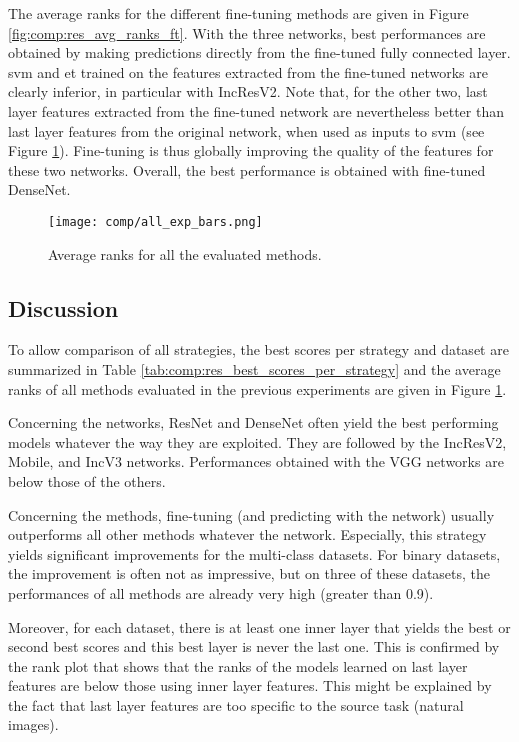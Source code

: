 The average ranks for the different fine-tuning methods are given in Figure \ref{fig:comp:res_avg_ranks_ft}. With the three networks, best performances are obtained by making predictions directly from the fine-tuned fully connected layer. \acrshort{svm} and \acrshort{et} trained on the features extracted from the fine-tuned networks are clearly inferior, in particular with IncResV2. Note that, for the other two, last layer features extracted from the fine-tuned network are nevertheless better than last layer features from the original network, when used as inputs to \acrshort{svm} (see Figure \ref{fig:comp:res_avg_ranks_all_methods}). Fine-tuning is thus globally improving the quality of the features for these two networks. Overall, the best performance is obtained with fine-tuned DenseNet.


\begin{figure}
    \centering 
    \texttt{[image: comp/all\_exp\_bars.png]}
    \caption{Average ranks for all the evaluated methods.}
    \label{fig:comp:res_avg_ranks_all_methods}
\end{figure}

\subsection{Discussion}
\label{ssec:comp:exp_comparing}

To allow comparison of all strategies, the best scores per strategy and dataset are summarized in Table \ref{tab:comp:res_best_scores_per_strategy} and the average ranks of all methods evaluated in the previous experiments are given in Figure \ref{fig:comp:res_avg_ranks_all_methods}.

Concerning the networks, ResNet and DenseNet often yield the best performing models whatever the way they are exploited. They are followed by the IncResV2, Mobile, and IncV3 networks. Performances obtained with the VGG networks are below those of the others.

Concerning the methods, fine-tuning (and predicting with the network) usually outperforms all other methods whatever the network. Especially, this strategy yields significant improvements for the multi-class datasets. For binary datasets, the improvement is often not as impressive, but on three of these datasets, the performances of all methods are already very high (greater than 0.9).

Moreover, for each dataset, there is at least one inner layer that yields the best or second best scores and this best layer is never the last one. This is confirmed by the rank plot that shows that the ranks of the models learned on last layer features are below those using inner layer features. This might be explained by the fact that last layer features are too specific to the source task (natural images).

